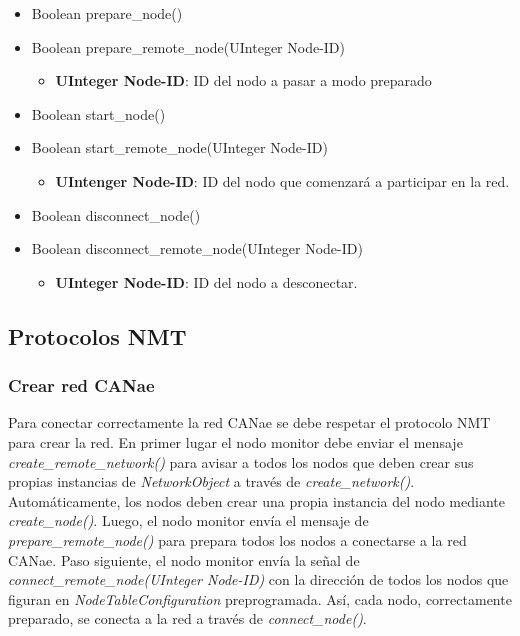 \begin{itemize}
\item Boolean prepare\_node()
\item Boolean prepare\_remote\_node(UInteger Node-ID)
  \begin{itemize}
   \item \textbf{UInteger Node-ID}: ID del nodo a pasar a modo preparado
  \end{itemize}
\item Boolean start\_node()
\item Boolean start\_remote\_node(UInteger Node-ID)
  \begin{itemize}
    \item \textbf{UIntenger Node-ID}: ID del nodo que comenzará a participar en la red.
   \end{itemize}
\item Boolean disconnect\_node()
\item Boolean disconnect\_remote\_node(UInteger Node-ID)
  \begin{itemize}
    \item \textbf{UInteger Node-ID}: ID del nodo a desconectar.
  \end{itemize}
\end{itemize}

\subsection{Protocolos NMT}
\subsubsection{Crear red CANae}
Para conectar correctamente la red CANae se debe respetar el protocolo NMT para
crear la red. En primer lugar el nodo monitor debe enviar el mensaje
\textit{create\_remote\_network()} para avisar a todos los nodos que deben crear
sus propias instancias de \textit{NetworkObject} a través de
\textit{create\_network()}. Automáticamente, los nodos deben crear una propia
instancia del nodo mediante \textit{create\_node()}. Luego, el nodo monitor
envía el mensaje de \textit{prepare\_remote\_node()} para prepara todos los
nodos a conectarse a la red CANae. Paso siguiente, el nodo monitor envía la señal de
\textit{connect\_remote\_node(UInteger Node-ID)} con la dirección de todos los
nodos que figuran en \textit{NodeTableConfiguration} preprogramada.
Así, cada nodo, correctamente preparado, se conecta a la red a través de
\textit{connect\_node()}.

